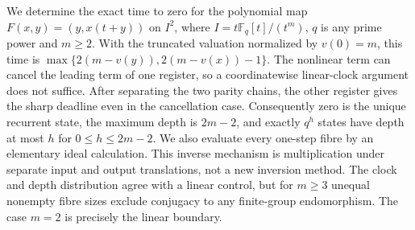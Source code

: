 We determine the exact time to zero for the polynomial map
$F(x,y)=(y,x(t+y))$ on $I^2$, where
$I=t\mathbb F_q[t]/(t^m)$, $q$ is any prime power and $m\geq2$.
With the truncated valuation normalized by $v(0)=m$, this time is
$\max\{2(m-v(y)),2(m-v(x))-1\}$.
The nonlinear term can cancel the leading term of one register, so a
coordinatewise linear-clock argument does not suffice. After separating the
two parity chains, the other register gives the sharp deadline even in the
cancellation case. Consequently zero is the unique recurrent state, the
maximum depth is $2m-2$, and exactly $q^h$ states have depth at most $h$
for $0\leq h\leq2m-2$.
We also evaluate every one-step fibre by an elementary ideal calculation.
This inverse mechanism is multiplication under separate input and output
translations, not a new inversion method. The clock and depth distribution
agree with a linear control, but for $m\geq3$ unequal nonempty fibre sizes
exclude conjugacy to any finite-group endomorphism. The case $m=2$ is
precisely the linear boundary.
